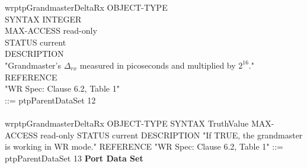 wrptpGrandmasterDeltaRx OBJECT-TYPE \\
SYNTAX INTEGER \\
MAX-ACCESS read-only \\
STATUS current \\
DESCRIPTION \\
"Grandmaster's $\Delta_{rx}$ measured in picoseconds and multiplied by
 $2^{16}$."  \\
REFERENCE  \\
"WR Spec: Clause 6.2, Table 1" \\
::= { ptpParentDataSet 12 } \\
\\
wrptpGrandmasterDeltaRx OBJECT-TYPE
SYNTAX TruthValue
MAX-ACCESS read-only
STATUS current
DESCRIPTION
"If TRUE, the grandmaster is working in WR mode."
REFERENCE
"WR Spec: Clause 6.2, Table 1"
::= { ptpParentDataSet 13 }
\vspace{5 mm}
\textbf{Port Data Set} \\
\vspace{5 mm}

